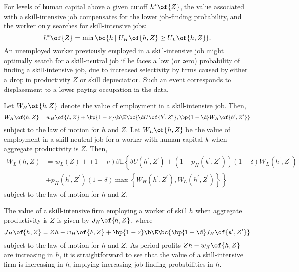 \documentclass[12pt]{article}
\theoremstyle{definition}
\begin{document}
For levels of human capital above a given cutoff $h^{*}\of{Z}$, the value associated with a skill-intensive job compensates for the lower job-finding probability, and the worker only searches for skill-intensive jobs:
\begin{equation}
    \label{12}
    h^{*}\of{Z} = \min \bc{h \mid U_H\of{h, Z} \geq U_L\of{h, Z}}.
\end{equation}
An unemployed worker previously employed in a skill-intensive job might optimally search for a skill-neutral job if he faces a low (or zero) probability of finding a skill-intensive job, due to increased selectivity by firms caused by either a drop in productivity $Z$ or skill depreciation. Such an event corresponds to displacement to a lower paying occupation in the data. 

Let $W_H\of{h, Z}$ denote the value of employment in a skill-intensive job. Then, 
\begin{equation}
    \label{13}
    W_H\of{h, Z} = w_H\of{h, Z} + \bp{1 - \nu} \b \E\bc{\d U\of{h^{\prime}, Z^{\prime}}, \bp{1-\d} W_H\of{h^{\prime}, Z^{\prime}}}
\end{equation}
subject to the law of motion for $h$ and $Z$. Let $W_L\of{h, Z}$ be the value of employment in a skill-neutral job for a worker with human capital $h$ when aggregate productivity is $Z$. Then, 
\begin{equation}
    \label{14}
    \begin{aligned}
        W_L(h, Z) & =w_L(Z)+(1-\nu) \beta \mathbb{E}\left\{\delta U\left(h^{\prime}, Z^{\prime}\right)+\left(1-p_H\left(h^{\prime}, Z^{\prime}\right)\right)(1-\delta) W_L\left(h^{\prime}, Z^{\prime}\right)\right. \\
        & \left.+p_H\left(h^{\prime}, Z^{\prime}\right)(1-\delta) \max \left\{W_H\left(h^{\prime}, Z^{\prime}\right), W_L\left(h^{\prime}, Z^{\prime}\right)\right\}\right\}
    \end{aligned}
\end{equation}
subject to the law of motion for $h$ and $Z$. 

The value of a skill-intensive firm employing a worker of skill $h$ when aggregate productivity is $Z$ is given by $J_H\of{h, Z}$, where 
\begin{equation}
    \label{15}
    J_H\of{h, Z} = Zh - w_H\of{h, Z} + \bp{1-\nu} \b \E\bc{\bp{1-\d} J_H\of{h^{\prime}, Z^{\prime}}}
\end{equation}
subject to the law of motion for $h$ and $Z$. As period profits $Zh - w_H\of{h, Z}$ are increasing in $h$, it is straightforward to see that the value of a skill-intensive firm is increasing in $h$, implying increasing job-finding probabilities in $h$.
\end{document}
